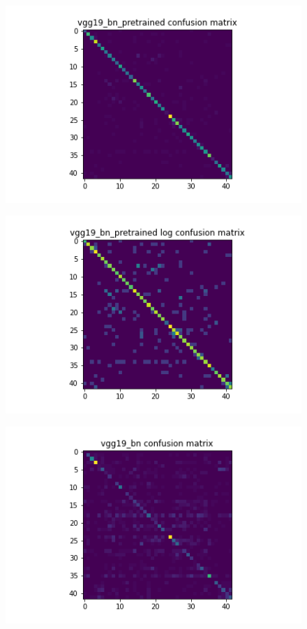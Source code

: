 \begin{figure}[t]

  \begin{minipage}[b]{.5\linewidth}
    \centering
    {\includegraphics[width=1.2\textwidth]{figs/conf_matrix/vgg19_bn_pretrained_conf.png}}
  \end{minipage}
  \hfill
  \begin{minipage}[b]{.5\linewidth}
    \centering
    {\includegraphics[width=1.2\textwidth]{figs/conf_matrix/vgg19_bn_pretrained_log_conf.png}}
  \end{minipage}
  \vfill
  \begin{minipage}[b]{.5\linewidth}
    \centering
    {\includegraphics[width=1.2\textwidth]{figs/conf_matrix/vgg19_bn_conf.png}}

\end{minipage}
\end{figure}
